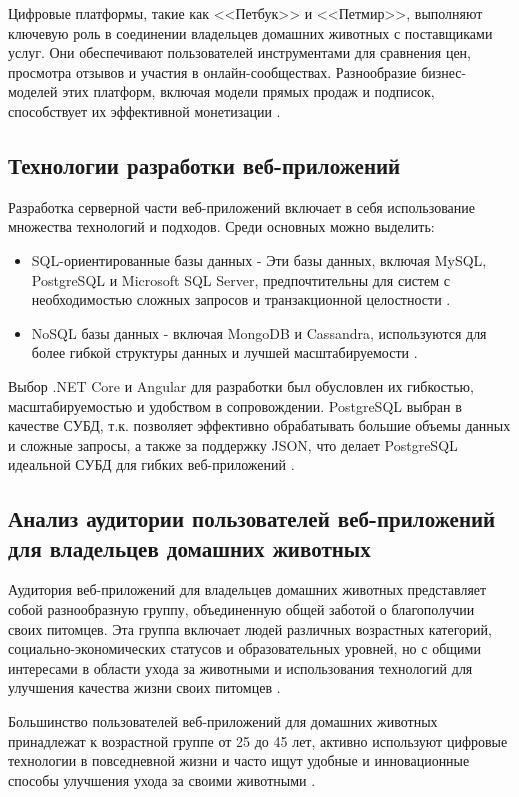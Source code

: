 Цифровые платформы, такие как <<Петбук>> и <<Петмир>>, выполняют ключевую роль в соединении владельцев домашних животных с поставщиками услуг. Они обеспечивают пользователей инструментами для сравнения цен, просмотра отзывов и участия в онлайн-сообществах. Разнообразие бизнес-моделей этих платформ, включая модели прямых продаж и подписок, способствует их эффективной монетизации \cite{market}.

\subsection{Технологии разработки веб-приложений}

Разработка серверной части веб-приложений включает в себя использование множества технологий и подходов. Среди основных можно выделить:

\begin{itemize}
  \item SQL-ориентированные базы данных -\- Эти базы данных, включая MySQL, PostgreSQL и Microsoft SQL Server, предпочтительны для систем с необходимостью сложных запросов и транзакционной целостности \cite{freedman}.
  \item NoSQL базы данных -\- включая MongoDB и Cassandra, используются для более гибкой структуры данных и лучшей масштабируемости \cite{market}.
\end{itemize}

Выбор .NET Core и Angular для разработки был обусловлен их гибкостью, масштабируемостью и удобством в сопровождении.
PostgreSQL выбран в качестве СУБД, т.к. позволяет эффективно обрабатывать большие объемы данных и сложные запросы, а также за поддержку JSON, что делает PostgreSQL идеальной СУБД для гибких веб-приложений \cite{freedman}.

\subsection{Анализ аудитории пользователей веб-приложений для владельцев домашних животных}

Аудитория веб-приложений для владельцев домашних животных представляет собой разнообразную группу, объединенную общей заботой о благополучии своих питомцев. Эта группа включает людей различных возрастных категорий, социально-экономических статусов и образовательных уровней, но с общими интересами в области ухода за животными и использования технологий для улучшения качества жизни своих питомцев \cite{market}.

Большинство пользователей веб-приложений для домашних животных принадлежат к возрастной группе от 25 до 45 лет, активно используют цифровые технологии в повседневной жизни и часто ищут удобные и инновационные способы улучшения ухода за своими животными \cite{freedman}.

